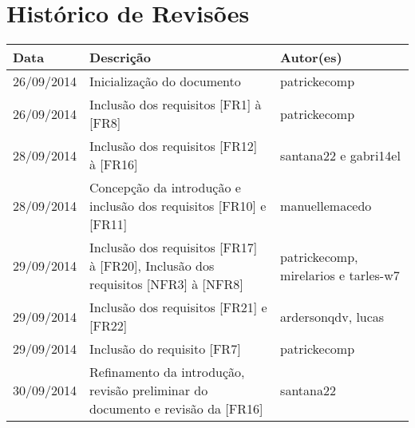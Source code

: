 \documentclass{article}
\begin{document}
		
\capa
		
\newpage
			
\section*{\center Histórico de Revisões}
	\vspace*{1cm}
	\begin{table}[ht]
	\centering
		\begin{tabular}[pos]{|m{2cm} | m{7.2cm} | m{3.8cm}|} \hline \cellcolor[gray]{0.9}

\textbf{Data} & \cellcolor[gray]{0.9}\textbf{Descrição} & \cellcolor[gray]{0.9} \textbf{Autor(es)}\\ \hline

\small 26/09/2014 & \small Inicialização do documento & \small patrickecomp \\ \hline      

\small 26/09/2014 & \small Inclusão dos requisitos [FR1] à [FR8] & \small patrickecomp \\ \hline 

\small 28/09/2014 & \small Inclusão dos requisitos [FR12] à [FR16] & \small santana22 e gabri14el \\ \hline

\small 28/09/2014 & \small Concepção da introdução e inclusão dos requisitos [FR10] e [FR11] & \small manuellemacedo \\ \hline 

\small 29/09/2014 & \small Inclusão dos requisitos [FR17] à [FR20], Inclusão dos requisitos [NFR3] à [NFR8] & \small patrickecomp, mirelarios e tarles-w7 \\ \hline    

\small 29/09/2014 & \small Inclusão dos requisitos [FR21] e [FR22] & \small ardersonqdv, lucas \\ \hline   

\small 29/09/2014 & \small Inclusão do requisito [FR7] & \small patrickecomp \\ \hline 

\small 30/09/2014 & \small Refinamento da introdução,  revisão preliminar do documento e revisão da [FR16] & \small santana22 \\ \hline


\end{tabular}
\end{table}
\end{document}
